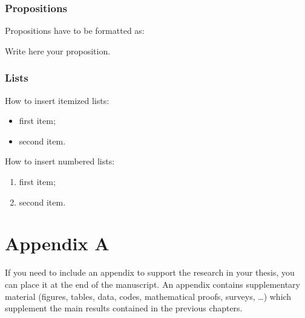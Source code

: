 \documentclass{Configuration_Files/PoliMi3i_thesis}
\begin{document}
\subsection{Propositions}
Propositions have to be formatted as:
\begin{proposition}
Write here your proposition.
\end{proposition}

\subsection{Lists}
How to  insert itemized lists:
\begin{itemize}
    \item first item;
    \item second item.
\end{itemize}
How to insert numbered lists:
\begin{enumerate}
    \item first item;
    \item second item.
\end{enumerate}


\cleardoublepage
{} %
\appendix
\chapter{Appendix A}
If you need to include an appendix to support the research in your thesis, you can place it at the end of the manuscript.
An appendix contains supplementary material (figures, tables, data, codes, mathematical proofs, surveys, \dots)
which supplement the main results contained in the previous chapters.


\listoffigures

\listoftables

\cleardoublepage
\end{document}
